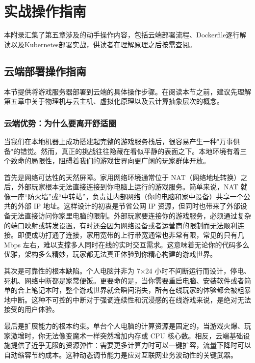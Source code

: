 \section{实战操作指南}
\label{sec:appendix-cloud-deploy}

本附录汇集了第五章涉及的动手操作内容，包括云端部署流程、Dockerfile逐行解读以及Kubernetes部署实战，供读者在理解原理之后按需查阅。

\subsection{云端部署操作指南}

本节提供将游戏服务器部署到云端的具体操作步骤。在阅读本节之前，建议先理解第五章中关于物理机与云主机、虚拟化原理以及云计算抽象层次的概念。

\subsubsection{云端优势：为什么要离开舒适圈}

当我们在本地机器上成功搭建起完整的游戏服务栈后，很容易产生一种"万事俱备"的错觉。然而，真正的挑战往往隐藏在看似平静的表面之下。本地环境有着三个致命的局限性，阻碍着我们的游戏世界向更广阔的玩家群体开放。

首先是网络可达性的天然屏障。家用网络环境通常位于 NAT（网络地址转换）之后，外部玩家根本无法直接连接到你电脑上运行的游戏服务。简单来说，NAT 就像一座“防火墙”或“中转站”，负责让内部网络（你的电脑和家中设备）共享一个公共的外部 IP 地址。这样设计的初衷是节省公网 IP 资源，但同时也带来了外部设备无法直接访问你家里电脑的限制。外部玩家要连接你的游戏服务，必须通过复杂的端口映射或转发设置，有时还会因为网络设备或者运营商的限制而无法顺利连接。即便成功打通了连接，家用宽带的上行带宽通常也非常有限，常见的只有几 Mbps 左右，难以支撑多人同时在线的实时交互需求。这意味着无论你的代码多么优雅，架构多么精妙，玩家都无法真正体验到你精心构建的游戏世界。

其次是可靠性的根本缺陷。个人电脑并非为 7×24 小时不间断运行而设计，停电、死机、网络中断都是家常便饭。更要命的是，当你需要重启电脑、安装软件或者简单的合上笔记本时，整个游戏世界就会瞬间消失，所有在线玩家的体验都会被粗暴地中断。这种不可控的中断对于强调连续性和沉浸感的在线游戏来说，是绝对无法接受的用户体验。

最后是扩展能力的根本约束。单台个人电脑的计算资源是固定的，当游戏火爆、玩家激增时，你无法像变魔术一样突然增加内存或 CPU 核心数。相反，云端基础设施提供了近乎无限的资源弹性：需要更多计算力时可以一键扩容，流量下降时可以自动缩容节约成本。这种动态调节能力是应对互联网业务波动性的关键武器。

